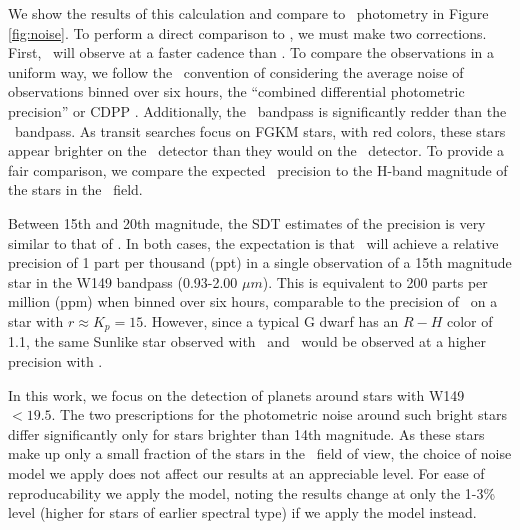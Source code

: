 We show the results of this calculation and compare to \kep\ photometry in Figure \ref{fig:noise}.
To perform a direct comparison to \kep, we must make two corrections. 
First, \WF\ will observe at a faster cadence than \kep. 
To compare the observations in a uniform way, we follow the \kep\ convention of considering
the average noise of observations binned over six hours, the ``combined differential 
photometric precision'' or CDPP \citep{Christiansen12}.
Additionally, the \WF\ bandpass is significantly redder than the \kep\ bandpass. 
As transit searches focus on FGKM stars, with red colors, these stars appear brighter on the
\WF\ detector than they would on the \kep\ detector.
To provide a fair comparison, we compare the expected \WF\ precision to the H-band magnitude
of the stars in the \kep\ field.

Between 15th and 20th magnitude, the SDT estimates of the precision is very similar to
that of \citet{Gould15}.
In both cases, the expectation is that \WF\ will achieve a relative precision of 1 part per 
thousand (ppt) in a single observation of a 15th magnitude star in the 
W149 bandpass (0.93-2.00 $\mu m$). This is equivalent to 200 parts per million 
(ppm) when binned over six hours, comparable to the precision of \kep\ on a star
with $r \approx K_p =15$. However, since a typical G dwarf has an $R-H$ color of 1.1, 
the same Sunlike star observed with \kep\ and \WF\ would be observed at
a higher precision with \WF.

In this work, we focus on the detection of planets around stars with W149 $< 19.5$. The two
prescriptions for the photometric noise around such bright stars differ significantly only for stars
brighter than 14th magnitude. 
As these stars make up only a small fraction of the stars in the \WF\ field of view, the choice of
noise model we apply does not affect our results at an appreciable level. 
For ease of reproducability we apply the \citet{Gould15} model, noting the results change at only
the 1-3\% level (higher for stars of earlier spectral type) if we apply the \citet{Spergel15} model
instead.

